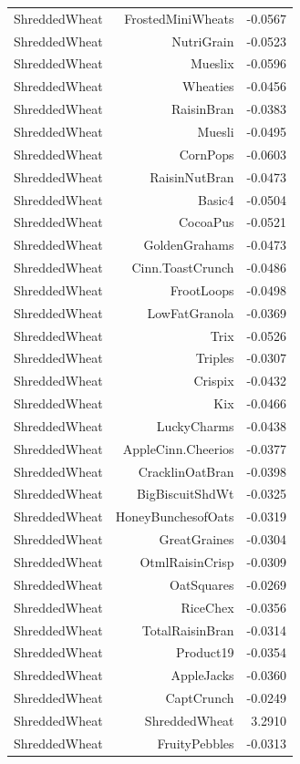 \begin{longtable}{@{}lrr@{}}
ShreddedWheat & FrostedMiniWheats & -0.0567 \\
ShreddedWheat & NutriGrain & -0.0523 \\
ShreddedWheat & Mueslix & -0.0596 \\
ShreddedWheat & Wheaties & -0.0456 \\
ShreddedWheat & RaisinBran & -0.0383 \\
ShreddedWheat & Muesli & -0.0495 \\
ShreddedWheat & CornPops & -0.0603 \\
ShreddedWheat & RaisinNutBran & -0.0473 \\
ShreddedWheat & Basic4 & -0.0504 \\
ShreddedWheat & CocoaPus & -0.0521 \\
ShreddedWheat & GoldenGrahams & -0.0473 \\
ShreddedWheat & Cinn.ToastCrunch & -0.0486 \\
ShreddedWheat & FrootLoops & -0.0498 \\
ShreddedWheat & LowFatGranola & -0.0369 \\
ShreddedWheat & Trix & -0.0526 \\
ShreddedWheat & Triples & -0.0307 \\
ShreddedWheat & Crispix & -0.0432 \\
ShreddedWheat & Kix & -0.0466 \\
ShreddedWheat & LuckyCharms & -0.0438 \\
ShreddedWheat & AppleCinn.Cheerios & -0.0377 \\
ShreddedWheat & CracklinOatBran & -0.0398 \\
ShreddedWheat & BigBiscuitShdWt & -0.0325 \\
ShreddedWheat & HoneyBunchesofOats & -0.0319 \\
ShreddedWheat & GreatGraines & -0.0304 \\
ShreddedWheat & OtmlRaisinCrisp & -0.0309 \\
ShreddedWheat & OatSquares & -0.0269 \\
ShreddedWheat & RiceChex & -0.0356 \\
ShreddedWheat & TotalRaisinBran & -0.0314 \\
ShreddedWheat & Product19 & -0.0354 \\
ShreddedWheat & AppleJacks & -0.0360 \\
ShreddedWheat & CaptCrunch & -0.0249 \\
ShreddedWheat & ShreddedWheat & 3.2910 \\
ShreddedWheat & FruityPebbles & -0.0313 \\

\end{longtable}
